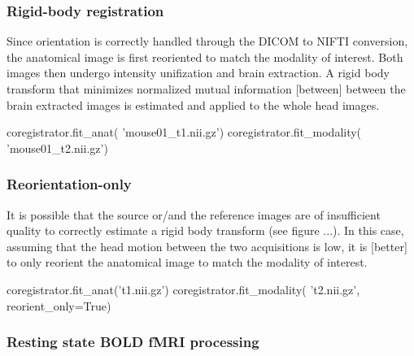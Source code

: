 \documentclass[utf8, a4paper, final, crop]{frontiersSCNS} %
\begin{document}
\subsubsection{Rigid-body registration}
Since orientation is correctly handled through the DICOM to NIFTI conversion,
the anatomical image is first reoriented to match the modality of interest.
Both images then undergo intensity unifization and brain extraction.
A rigid body
transform that minimizes normalized mutual information [between]
between the brain extracted images is estimated and applied to the whole head images.
\begin{python}
coregistrator.fit_anat(
    'mouse01_t1.nii.gz')
coregistrator.fit_modality(
    'mouse01_t2.nii.gz')
\end{python}

\subsubsection{Reorientation-only}

It is possible that the source or/and the reference
images are of insufficient quality to correctly estimate a rigid body transform
(see figure ...). In this case,
assuming that the head motion between the two acquisitions is low, it is [better]
to only reorient the anatomical image to match the modality of interest.
\begin{python}
coregistrator.fit_anat('t1.nii.gz')
coregistrator.fit_modality(
    't2.nii.gz',
    reorient_only=True)
\end{python}

\subsubsection{Resting state BOLD fMRI processing}
\end{document}
